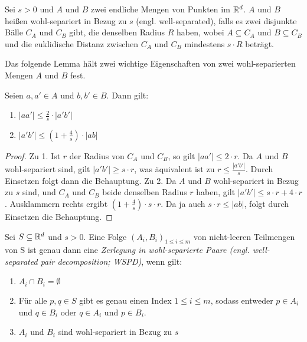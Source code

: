 \begin{definition}
    	\label{def:wellsep}
    	Sei $s > 0$ und $A$ und $B$ zwei endliche Mengen von Punkten im $\mathbb{R}^d$. $A$ und $B$ heißen wohl-separiert in Bezug zu $s$ (engl. well-separated), falls es zwei disjunkte Bälle $C_A$ und $C_B$ gibt, die denselben Radius $R$ haben, wobei $A \subseteq C_A$ und $B \subseteq C_B$ und die euklidische Distanz zwischen $C_A$ und $C_B$ mindestens $s\cdot R$ beträgt.
    \end{definition}
    
    Das folgende Lemma hält zwei wichtige Eigenschaften von zwei wohl-separierten Mengen $A$ und $B$ fest.
    \begin{lemma}
    	\label{lem:wellsep}
		Seien $a, a' \in A$ und $b, b' \in B$. Dann gilt:
		\begin{enumerate}
			\item $\displaystyle |aa'| \leq \frac{2}{s}\cdot|a'b'|$
			\item $\displaystyle |a'b'| \leq (1+\frac{4}{s})\cdot|ab|$
		\end{enumerate}
    \end{lemma}
    \begin{proof}
    	Zu 1. Ist $r$ der Radius von $C_A$ und $C_B$, so gilt $|aa'| \leq 2 \cdot r$. Da $A$ und $B$ wohl-separiert sind, gilt $|a'b'| \geq s \cdot r$, was äquivalent ist zu $r \leq \frac{|a'b'|}{s}$. Durch Einsetzen folgt dann die Behauptung.
    	Zu 2. Da $A$ und $B$ wohl-separiert in Bezug zu $s$ sind, und $C_A$ und $C_B$ beide denselben Radius $r$ haben, gilt $|a'b'| \leq s \cdot r + 4 \cdot r$. Ausklammern rechts ergibt $(1 + \frac{4}{s}) \cdot s \cdot r$. Da ja auch $s \cdot r \leq |ab|$, folgt durch Einsetzen die Behauptung.
    \end{proof}
    
    \begin{definition}
    	\label{def:wspd}
    	Sei $S \subseteq \mathbb{R}^d$ und $s > 0$. Eine Folge $(A_i, B_i)_{1 \leq i \leq m}$ von nicht-leeren Teilmengen von S ist genau dann eine \emph{Zerlegung in wohl-separierte Paare (engl. well-separated pair decomposition; WSPD)}, wenn gilt:
    	\begin{enumerate}[label={(\arabic*)}, itemsep=0mm]
    		\item $A_i \cap B_i = \emptyset$
    		\item Für alle $p, q \in S$ gibt es genau einen Index $1 \leq i \leq m$, sodass entweder $p \in A_i$ und $q \in B_i$ oder $q \in A_i$ und $p \in B_i$.
    		\item $A_i$ und $B_i$ sind wohl-separiert in Bezug zu $s$
    	\end{enumerate}
    \end{definition}
	
